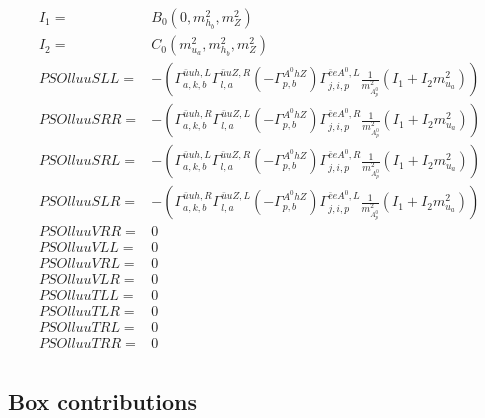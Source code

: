 \documentclass[A4,landscape]{article}
\begin{document}
\begin{align} 
I_1= & B_0(0, m^2_{h_{{b}}}, m^2_{Z}) \\ 
I_2= & C_0(m^2_{u_{{a}}}, m^2_{h_{{b}}}, m^2_{Z}) \\ 
  PSOlluuSLL= & -( \Gamma^{\bar{u}u h ,L}_{a, k, b} \Gamma^{\bar{u}u Z ,R}_{l, a} (- \Gamma^{A^0 h Z } _{p, b}) \Gamma^{\bar{e}e A^0 ,L}_{j, i, p} \frac{1}{m^2_{A^0_{{p}}}} (I_1 + I_2 m^2_{u_{{a}}})) \\ 
  PSOlluuSRR= & -( \Gamma^{\bar{u}u h ,R}_{a, k, b} \Gamma^{\bar{u}u Z ,L}_{l, a} (- \Gamma^{A^0 h Z } _{p, b}) \Gamma^{\bar{e}e A^0 ,R}_{j, i, p} \frac{1}{m^2_{A^0_{{p}}}} (I_1 + I_2 m^2_{u_{{a}}})) \\ 
  PSOlluuSRL= & -( \Gamma^{\bar{u}u h ,L}_{a, k, b} \Gamma^{\bar{u}u Z ,R}_{l, a} (- \Gamma^{A^0 h Z } _{p, b}) \Gamma^{\bar{e}e A^0 ,R}_{j, i, p} \frac{1}{m^2_{A^0_{{p}}}} (I_1 + I_2 m^2_{u_{{a}}})) \\ 
  PSOlluuSLR= & -( \Gamma^{\bar{u}u h ,R}_{a, k, b} \Gamma^{\bar{u}u Z ,L}_{l, a} (- \Gamma^{A^0 h Z } _{p, b}) \Gamma^{\bar{e}e A^0 ,L}_{j, i, p} \frac{1}{m^2_{A^0_{{p}}}} (I_1 + I_2 m^2_{u_{{a}}})) \\ 
  PSOlluuVRR= & 0 \\ 
  PSOlluuVLL= & 0 \\ 
  PSOlluuVRL= & 0 \\ 
  PSOlluuVLR= & 0 \\ 
  PSOlluuTLL= & 0 \\ 
  PSOlluuTLR= & 0 \\ 
  PSOlluuTRL= & 0 \\ 
  PSOlluuTRR= & 0 \\ 
\end{align} 
\subsection{Box contributions} 
\end{document}
